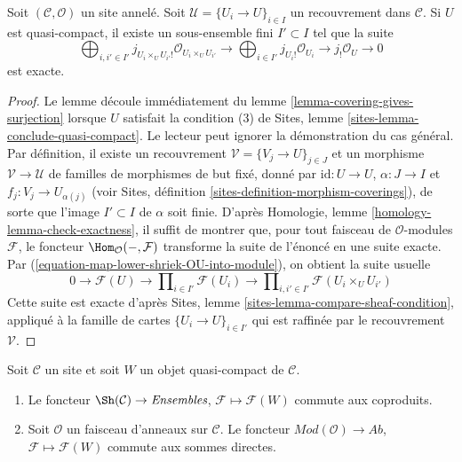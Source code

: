 \begin{lemma}

\label{lemma-silly-quasi-compact}
Soit $(\mathcal{C}, \mathcal{O})$ un site annelé. Soit
$\mathcal{U} = \{U_i \to U\}_{i \in I}$ un recouvrement dans
$\mathcal{C}$. Si $U$ est quasi-compact, il existe un sous-ensemble fini
$I' \subset I$ tel que la suite
$$
\bigoplus\nolimits_{i, i' \in I'}
j_{U_i \times_U U_{i'}!}\mathcal{O}_{U_i \times_U U_{i'}} \to
\bigoplus\nolimits_{i \in I'}
j_{U_i!}\mathcal{O}_{U_i} \to
j_!\mathcal{O}_U \to 0
$$ est exacte.
\end{lemma}

\begin{proof}

Le lemme découle immédiatement du lemme
\ref{lemma-covering-gives-surjection} lorsque $U$ satisfait la condition
(3) de Sites, lemme \ref{sites-lemma-conclude-quasi-compact}. Le lecteur
peut ignorer la démonstration du cas général. Par définition, il existe un
recouvrement
$\mathcal{V} = \{V_j \to U\}_{j \in J}$ et un morphisme
$\mathcal{V} \to \mathcal{U}$ de familles de morphismes de but fixé, donné
par $\text{id} : U \to U$, $\alpha : J \to I$ et
$f_j : V_j \to U_{\alpha(j)}$
(voir Sites, définition \ref{sites-definition-morphism-coverings}), de sorte
que l'image $I' \subset I$ de $\alpha$ soit finie. D'après Homologie, lemme
\ref{homology-lemma-check-exactness}, il suffit de montrer que, pour tout
faisceau de $\mathcal{O}$-modules $\mathcal{F}$, le foncteur
$\Hom_\mathcal{O}(-, \mathcal{F})$ transforme la suite de l'énoncé en une
suite exacte. Par (\ref{equation-map-lower-shriek-OU-into-module}), on
obtient la suite usuelle
$$
0 \to
\mathcal{F}(U) \to
\prod\nolimits_{i \in I'} \mathcal{F}(U_i) \to
\prod\nolimits_{i, i' \in I'} \mathcal{F}(U_i \times_U U_{i'})
$$
Cette suite est exacte d'après Sites, lemme
\ref{sites-lemma-compare-sheaf-condition},
appliqué à la famille de cartes $\{U_i \to U\}_{i \in I'}$
qui est raffinée par le recouvrement $\mathcal{V}$.

\end{proof}

\begin{lemma}

\label{lemma-sections-over-quasi-compact}
Soit $\mathcal{C}$ un site et soit $W$ un objet quasi-compact de
$\mathcal{C}$.
\begin{enumerate}
\item Le foncteur $\Sh(\mathcal{C}) \to \textit{Ensembles}$,
$\mathcal{F} \mapsto \mathcal{F}(W)$ commute aux coproduits.
\item Soit $\mathcal{O}$ un faisceau d'anneaux sur $\mathcal{C}$. Le
foncteur $\textit{Mod}(\mathcal{O}) \to \textit{Ab}$,
$\mathcal{F} \mapsto \mathcal{F}(W)$ commute aux sommes directes.
\end{enumerate}

\end{lemma}

